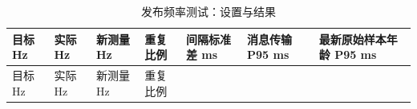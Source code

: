 \FloatBarrier\begingroup\small\setlength{\tabcolsep}{2.5pt}
\begin{longtable}[]{@{}
  >{\raggedright\arraybackslash}p{}
  >{\raggedright\arraybackslash}p{}
  >{\raggedright\arraybackslash}p{}
  >{\raggedright\arraybackslash}p{}
  >{\raggedright\arraybackslash}p{}
  >{\raggedright\arraybackslash}p{}
  >{\raggedright\arraybackslash}p{}@{}}
\caption{发布频率测试：设置与结果}\label{tab:s08-2}\tabularnewline
\toprule\noalign{}
\begin{minipage}[b]{\linewidth}\raggedright
目标 Hz
\end{minipage} & \begin{minipage}[b]{\linewidth}\raggedright
实际 Hz
\end{minipage} & \begin{minipage}[b]{\linewidth}\raggedright
新测量 Hz
\end{minipage} & \begin{minipage}[b]{\linewidth}\raggedright
重复比例
\end{minipage} & \begin{minipage}[b]{\linewidth}\raggedright
间隔标准差 ms
\end{minipage} & \begin{minipage}[b]{\linewidth}\raggedright
消息传输 P95 ms
\end{minipage} & \begin{minipage}[b]{\linewidth}\raggedright
最新原始样本年龄 P95 ms
\end{minipage} \\
\midrule\noalign{}
\endfirsthead
\toprule\noalign{}
\begin{minipage}[b]{\linewidth}\raggedright
目标 Hz
\end{minipage} & \begin{minipage}[b]{\linewidth}\raggedright
实际 Hz
\end{minipage} & \begin{minipage}[b]{\linewidth}\raggedright
新测量 Hz
\end{minipage} & \begin{minipage}[b]{\linewidth}\raggedright
重复比例
\end{minipage} & \begin{minipage}[b]{\linewidth}\raggedright

\end{minipage}
\end{longtable}
